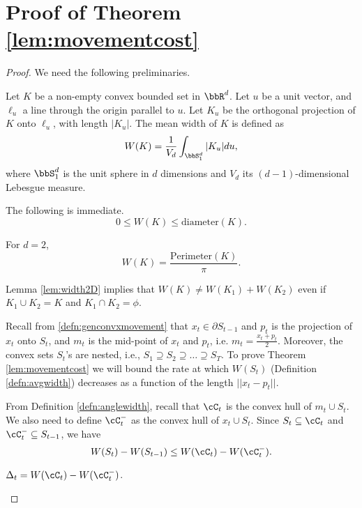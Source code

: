 \section{Proof of Theorem \ref{lem:movementcost}}
\begin{proof}
We need the following preliminaries.

 \begin{definition}\label{defn:avgwidth}
Let $K$ be a non-empty convex bounded set in $\bbR^d$. Let $u$ be a unit vector, and $\ell_u$ a line through the origin parallel to $u$. 
Let $K_u$ be the orthogonal projection of $K$ onto $\ell_u$, with length $|K_u|$. The mean width of $K$ is defined as 
\begin{equation}\label{eq:projlength}
W(K) = \frac{1}{V_d} \int_{\bbS_1^d} |K_u| du,
\end{equation}
where $\bbS_1^d$ is the unit sphere in $d$ dimensions and $V_d$ its $(d-1)$-dimensional Lebesgue measure.
\end{definition}


The following is immediate. 
\begin{equation}\label{eq:WBound1}
0\le W(K) \le \text{diameter}(K).
\end{equation}

\begin{lemma}\label{lem:width2D}\cite{eggleston1966convexity}
For $d=2$, $$W(K)=\frac{\text{Perimeter}(K)}{\pi}.$$
\end{lemma}
Lemma \ref{lem:width2D} implies that $W(K) \ne W(K_1) + W(K_2)$ even if $K_1\cup K_2=K$ and $K_1\cap K_2=\phi$.




Recall from \eqref{defn:genconvxmovement} that $x_t\in  \partial S_{t-1}$ and $p_t$ is the projection of $x_t$ onto $S_{t}$, and $m_t$ is the mid-point of $x_t$ and $p_t$, i.e. $m_t = \frac{x_t+p_t}{2}$. Moreover, the convex sets $S_t$'s are nested, i.e., $S_1\supseteq S_2 \supseteq \dots \supseteq S_T$.
To prove Theorem \ref{lem:movementcost} we will bound the rate at which $W(S_t)$ (Definition \ref{defn:avgwidth}) decreases as a function of the length $||x_t-p_t||$. 

From Definition \ref{defn:anglewidth}, recall that $\cC_t$ is the convex hull of $m_t\cup S_{t}$. We also need to define $\cC_t^-$ as the convex hull of $x_t\cup S_{t}$. Since 
$S_t \subseteq \cC_t$ and $\cC_t^- \subseteq S_{t-1}$, we have \begin{equation}\label{eq:widthlb}
W(S_{t}) - W(S_{t-1}) \le W(\cC_t) - W(\cC_t^-).
\end{equation} 
\begin{definition}\label{}
$\Delta_t = W(\cC_t) - W(\cC_t^-)$.
\end{definition}




\end{proof}
